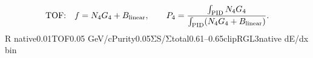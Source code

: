 \documentclass[10pt,a4paper]{article}
\begin{document}
\[\text{TOF:}\quad f=N_4G_4+B_{\rm linear},\qquad P_4=\frac{\int_{\rm PID}N_4G_4}{\int_{\rm PID}(N_4G_4+B_{\rm linear})}.\]
\hspace{0pt}{\jpfont 低}\hspace{0pt}R native\hspace{0pt}{\jpfont 幅}\hspace{0pt}0.01\hspace{0pt}{\jpfont 、}\hspace{0pt}TOF\hspace{0pt}{\jpfont 側は既存}\hspace{0pt}0.05 GeV/\allowbreak{}c\hspace{0pt}{\jpfont 。}\hspace{0pt}Purity\hspace{0pt}{\jpfont 表示は}\hspace{0pt}0.05\hspace{0pt}{\jpfont 幅へ}\hspace{0pt}ΣS/\allowbreak{}Σtotal\hspace{0pt}{\jpfont で集約し、最初のみ}\hspace{0pt}0.61–0.65\hspace{0pt}{\jpfont へ}\hspace{0pt}clip\hspace{0pt}{\jpfont する。}\hspace{0pt}R\hspace{0pt}{\jpfont 方向は}\hspace{0pt}GL3\hspace{0pt}{\jpfont で積分、生計数は}\hspace{0pt}native dE/\allowbreak{}dx bin\hspace{0pt}{\jpfont の重なり比から独立計数する。}\hspace{0pt}


\clearpage
\end{document}
